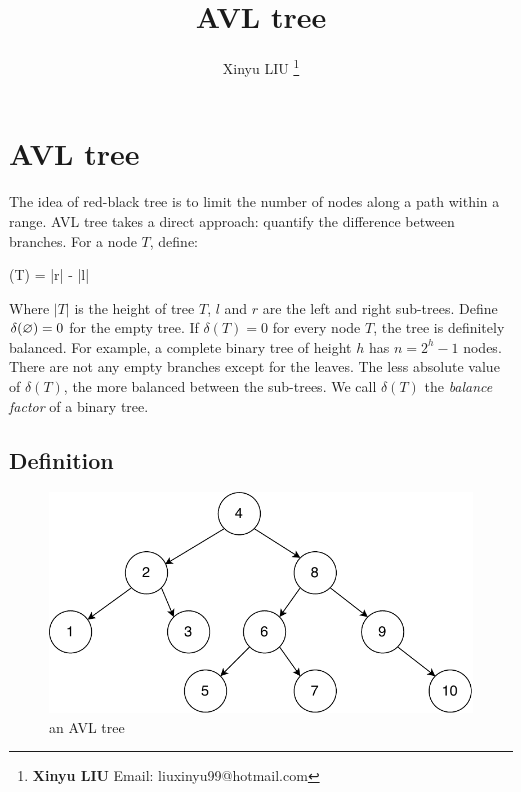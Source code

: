 \documentclass[b5paper]{article}
\begin{document}
\title{AVL tree}

\author{Xinyu LIU
\thanks{{\bfseries Xinyu LIU} \newline
  Email: liuxinyu99@hotmail.com \newline}
  }

\maketitle
\fi


\ifx\wholebook\relax
\chapter{AVL tree}
\fi

\label{introduction} 

The idea of red-black tree is to limit the number of nodes along a path within a range. AVL tree takes a direct approach: quantify the difference between branches. For a node $T$, define:

\be
  \delta(T) = |r| - |l|
\ee

Where $|T|$ is the height of tree $T$, $l$ and $r$ are the left and right sub-trees. Define $\delta(\varnothing) = 0$ for the empty tree. If $\delta(T) = 0$ for every node $T$, the tree is definitely balanced. For example, a complete binary tree of height $h$ has $n=2^h - 1$ nodes. There are not any empty branches except for the leaves. The less absolute value of $\delta(T)$, the more balanced between the sub-trees. We call $\delta(T)$ the {\em balance factor} of a binary tree.

\section{Definition}

\begin{figure}[htbp]
   \centering
   \includegraphics[scale=0.5, page=1]{img/avltree}
   \caption{an AVL tree}
   \label{fig:avl-example}
\end{figure}
\end{document}
